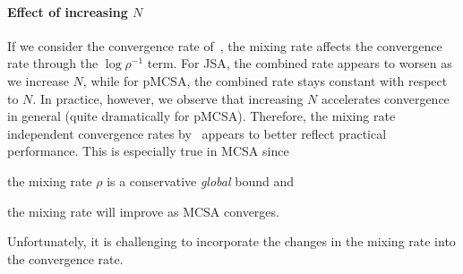\paragraph{Effect of increasing \(N\)}
If we consider the convergence rate of~\citet{duchi_ergodic_2012}, the mixing rate affects the convergence rate through the \(\log \rho^{-1}\) term.
For JSA, the combined rate appears to worsen as we increase \(N\), while for pMCSA, the combined rate stays constant with respect to \(N\).
In practice, however, we observe that increasing \(N\) accelerates convergence in general (quite dramatically for pMCSA).
Therefore, the mixing rate independent convergence rates by~\citet{doan_finitetime_2020, doan_convergence_2020} appears to better reflect practical performance.
This is especially true in MCSA since
\begin{enumerate*}[label=\textbf{(\roman*)}]
  \item the mixing rate \(\rho\) is a conservative \textit{global} bound and 
  \item the mixing rate will improve as MCSA converges.
\end{enumerate*}
Unfortunately, it is challenging to incorporate the changes in the mixing rate into the convergence rate.


